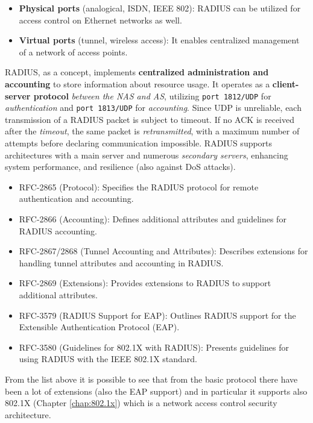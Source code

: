 \begin{itemize}
	\item \textbf{Physical ports} (analogical, ISDN, IEEE 802): RADIUS can be utilized for access control on Ethernet networks as well.
	\item \textbf{Virtual ports} (tunnel, wireless access): It enables centralized management of a network of access points.
\end{itemize}

RADIUS, as a concept, implements \textbf{centralized administration and accounting} to store information about resource usage. It operates as a \textbf{client-server protocol} \textit{between the NAS and AS}, utilizing \texttt{port 1812/UDP} for \textit{authentication} and \texttt{port 1813/UDP} for \textit{accounting}.
Since UDP is unreliable, each transmission of a RADIUS packet is subject to timeout. If no ACK is received after the \textit{timeout}, the same packet is \textit{retransmitted}, with a maximum number of attempts before declaring communication impossible.
RADIUS supports architectures with a main server and numerous \textit{secondary servers}, enhancing system performance, and resilience (also against DoS attacks).

\begin{itemize}
	\item RFC-2865 (Protocol): Specifies the RADIUS protocol for remote authentication and accounting.
	\item RFC-2866 (Accounting): Defines additional attributes and guidelines for RADIUS accounting.
	\item RFC-2867/2868 (Tunnel Accounting and Attributes): Describes extensions for handling tunnel attributes and accounting in RADIUS.
	\item RFC-2869 (Extensions): Provides extensions to RADIUS to support additional attributes.
	\item RFC-3579 (RADIUS Support for EAP): Outlines RADIUS support for the Extensible Authentication Protocol (EAP).
	\item RFC-3580 (Guidelines for 802.1X with RADIUS): Presents guidelines for using RADIUS with the IEEE 802.1X standard.
\end{itemize}

From the list above it is possible to see that from the basic protocol there have been a lot of extensions (also
the EAP support) and in particular it supports also 802.1X (Chapter \ref{chap:802.1x}) which is a network access control security
architecture.


